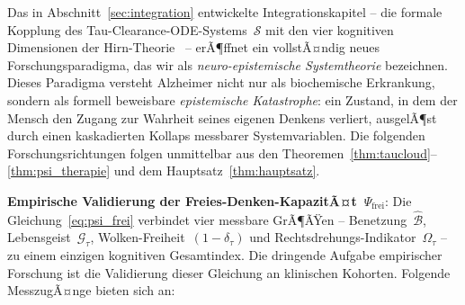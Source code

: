 ﻿\documentclass[12pt,a4paper]{article}
\theoremstyle{definition}
\begin{document}
	Das in Abschnitt~\ref{sec:integration} entwickelte Integrationskapitel -- die formale Kopplung des Tau-Clearance-ODE-Systems~$\mathcal{S}$ mit den vier kognitiven Dimensionen der Hirn-Theorie~\cite{Epp2026brn} -- erÃ¶ffnet ein vollstÃ¤ndig neues Forschungsparadigma, das wir als \emph{neuro-epistemische Systemtheorie} bezeichnen. Dieses Paradigma versteht Alzheimer nicht nur als biochemische Erkrankung, sondern als formell beweisbare \emph{epistemische Katastrophe}: ein Zustand, in dem der Mensch den Zugang zur Wahrheit seines eigenen Denkens verliert, ausgelÃ¶st durch einen kaskadierten Kollaps messbarer Systemvariablen. Die folgenden Forschungsrichtungen folgen unmittelbar aus den Theoremen~\ref{thm:taucloud}--\ref{thm:psi_therapie} und dem Hauptsatz~\ref{thm:hauptsatz}.

	\textbf{Empirische Validierung der Freies-Denken-KapazitÃ¤t~$\Psi_{\mathrm{frei}}$}:
	Die Gleichung~\eqref{eq:psi_frei} verbindet vier messbare GrÃ¶ÃŸen -- Benetzung~$\hat{\mathcal{B}}$, Lebensgeist~$\mathcal{G}_\tau$, Wolken-Freiheit~$(1-\delta_\tau)$ und Rechtsdrehungs-Indikator~$\Omega_\tau$ -- zu einem einzigen kognitiven Gesamtindex. Die dringende Aufgabe empirischer Forschung ist die Validierung dieser Gleichung an klinischen Kohorten.
	Folgende MesszugÃ¤nge bieten sich an:
\end{document}
